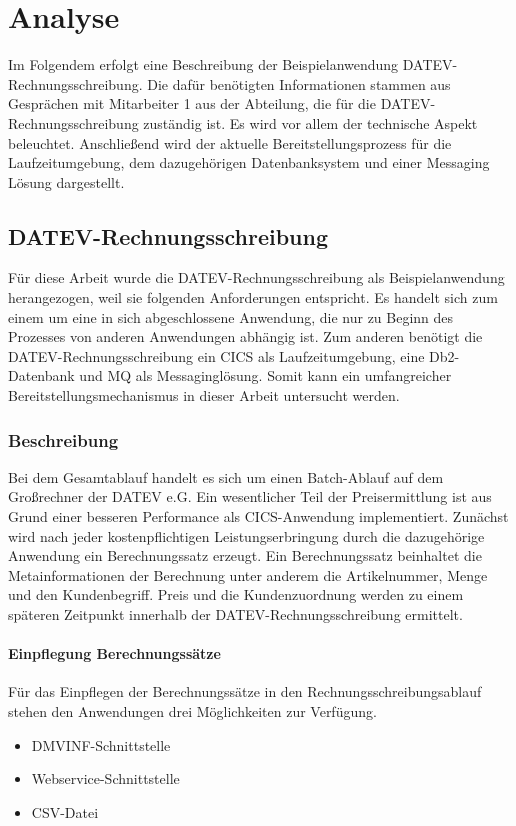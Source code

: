 \chapter{Analyse}\label{ch:analyse}
Im Folgendem erfolgt eine Beschreibung der Beispielanwendung \glqq DATEV-Rechnungsschreibung\grqq.
Die dafür benötigten Informationen stammen aus Gesprächen mit Mitarbeiter 1 aus der Abteilung, die für die DATEV-Rechnungsschreibung zuständig ist.
Es wird vor allem der technische Aspekt beleuchtet.
Anschließend wird der aktuelle Bereitstellungsprozess für die Laufzeitumgebung, dem dazugehörigen Datenbanksystem und einer Messaging Lösung dargestellt.

\section{DATEV-Rechnungsschreibung}
Für diese Arbeit wurde die DATEV-Rechnungsschreibung als Beispielanwendung herangezogen, weil sie folgenden Anforderungen entspricht.
Es handelt sich zum einem um eine in sich abgeschlossene Anwendung, die nur zu Beginn des Prozesses von anderen Anwendungen abhängig ist.
Zum anderen benötigt die DATEV-Rechnungsschreibung ein CICS als Laufzeitumgebung, eine Db2-Datenbank und MQ als Messaginglösung.
Somit kann ein umfangreicher Bereitstellungsmechanismus in dieser Arbeit untersucht werden.

\subsection{Beschreibung}\label{rechBesch}
Bei dem Gesamtablauf handelt es sich um einen Batch-Ablauf auf dem Großrechner der DATEV e.G.
Ein wesentlicher Teil der Preisermittlung ist aus Grund einer besseren Performance als CICS-Anwendung implementiert.
Zunächst wird nach jeder kostenpflichtigen Leistungserbringung durch die dazugehörige Anwendung ein Berechnungssatz erzeugt.
Ein Berechnungssatz beinhaltet die Metainformationen der Berechnung unter anderem die Artikelnummer, Menge und den Kundenbegriff.
Preis und die Kundenzuordnung werden zu einem späteren Zeitpunkt innerhalb der DATEV-Rechnungsschreibung ermittelt.

\subsubsection{Einpflegung Berechnungssätze}
Für das Einpflegen der Berechnungssätze in den Rechnungsschreibungsablauf stehen den Anwendungen drei Möglichkeiten zur Verfügung.
\begin{itemize}
\item DMVINF-Schnittstelle
\item Webservice-Schnittstelle
\item CSV-Datei
\end{itemize}

